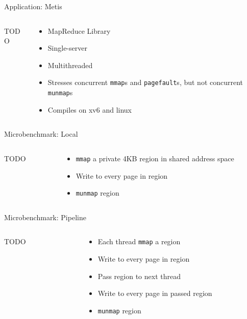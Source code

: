 \documentclass[aspectratio=169]{beamer}
\newcommand{\bi}{\begin{itemize}}
\newcommand{\ei}{\end{itemize}}
\begin{document}
\begin{frame}{Application: Metis}
  \begin{columns}[T]
    \begin{column}{0.2\textwidth}
      TODO
    \end{column}
    \begin{column}{0.8\textwidth}
      \bi
    \item MapReduce Library
    \item Single-server
    \item Multithreaded
    \item Stresses concurrent \texttt{mmap}s and \texttt{pagefault}s, but not concurrent \texttt{munmap}s
    \item Compiles on xv6 and linux
      \ei
    \end{column}
  \end{columns}
\end{frame}

\begin{frame}{Microbenchmark: Local}
  \begin{columns}[T]
    \begin{column}{0.2\textwidth}
      TODO
    \end{column}
    \begin{column}{0.8\textwidth}
      \bi
    \item \texttt{mmap} a private 4KB region in shared address space
    \item Write to every page in region
    \item \texttt{munmap} region
      \ei
    \end{column}
  \end{columns}
\end{frame}

\begin{frame}{Microbenchmark: Pipeline}
  \begin{columns}[T]
    \begin{column}{0.2\textwidth}
      TODO
    \end{column}
    \begin{column}{0.8\textwidth}
      \bi
    \item Each thread \texttt{mmap} a region
    \item Write to every page in region
    \item Pass region to next thread
    \item Write to every page in passed region
    \item \texttt{munmap} region
      \ei
    \end{column}
  \end{columns}
\end{frame}
\end{document}

